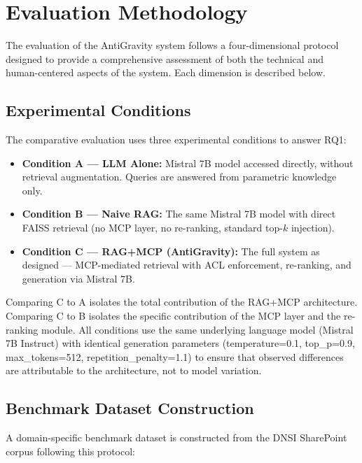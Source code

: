 \section{Evaluation Methodology}
\label{sec:method-evaluation}

The evaluation of the AntiGravity system follows a four-dimensional protocol designed to provide a comprehensive assessment of both the technical and human-centered aspects of the system. Each dimension is described below.

\subsection{Experimental Conditions}

The comparative evaluation uses three experimental conditions to answer RQ1:

\begin{itemize}
  \item \textbf{Condition A — LLM Alone:} Mistral 7B model accessed directly, without retrieval augmentation. Queries are answered from parametric knowledge only.
  \item \textbf{Condition B — Naive RAG:} The same Mistral 7B model with direct FAISS retrieval (no MCP layer, no re-ranking, standard top-$k$ injection).
  \item \textbf{Condition C — RAG+MCP (AntiGravity):} The full system as designed — MCP-mediated retrieval with ACL enforcement, re-ranking, and generation via Mistral 7B.
\end{itemize}

Comparing C to A isolates the total contribution of the RAG+MCP architecture. Comparing C to B isolates the specific contribution of the MCP layer and the re-ranking module. All conditions use the same underlying language model (Mistral 7B Instruct) with identical generation parameters (temperature=0.1, top\_p=0.9, max\_tokens=512, repetition\_penalty=1.1) to ensure that observed differences are attributable to the architecture, not to model variation.

\subsection{Benchmark Dataset Construction}

A domain-specific benchmark dataset is constructed from the DNSI SharePoint corpus following this protocol:

